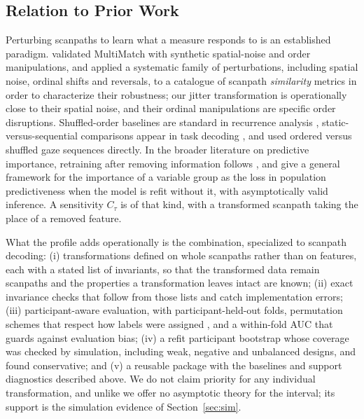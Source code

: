 \documentclass[man,floatsintext,12pt]{apa7}
\newcommand{\Cs}{C}
\begin{document}
\subsection{Relation to Prior Work}
Perturbing scanpaths to learn what a measure responds to is an established paradigm. \citet{dewhurst2012multimatch} validated MultiMatch with synthetic spatial-noise and order manipulations, and \citet{fahimi2021metrics} applied a systematic family of perturbations, including spatial noise, ordinal shifts and reversals, to a catalogue of scanpath \emph{similarity} metrics in order to characterize their robustness; our jitter transformation is operationally close to their spatial noise, and their ordinal manipulations are specific order disruptions. Shuffled-order baselines are standard in recurrence analysis \citep{anderson2013recurrence, anderson2015comparison}, static-versus-sequential comparisons appear in task decoding \citep{greene2012reconsidering}, and \citet{meghanathan2026temporal} used ordered versus shuffled gaze sequences directly. In the broader literature on predictive importance, retraining after removing information follows \citet{hooker2019benchmark}, and \citet{williamson2023general} give a general framework for the importance of a variable group as the loss in population predictiveness when the model is refit without it, with asymptotically valid inference. A sensitivity $\Cs_\tau$ is of that kind, with a transformed scanpath taking the place of a removed feature.

What the profile adds operationally is the combination, specialized to scanpath decoding: (i) transformations defined on whole scanpaths rather than on features, each with a stated list of invariants, so that the transformed data remain scanpaths and the properties a transformation leaves intact are known; (ii) exact invariance checks that follow from those lists and catch implementation errors; (iii) participant-aware evaluation, with participant-held-out folds, permutation schemes that respect how labels were assigned \citep{ojala2010permutation}, and a within-fold AUC that guards against evaluation bias; (iv) a refit participant bootstrap whose coverage was checked by simulation, including weak, negative and unbalanced designs, and found conservative; and (v) a reusable package with the baselines and support diagnostics described above. We do not claim priority for any individual transformation, and unlike \citet{williamson2023general} we offer no asymptotic theory for the interval; its support is the simulation evidence of Section~\ref{sec:sim}.
\end{document}

